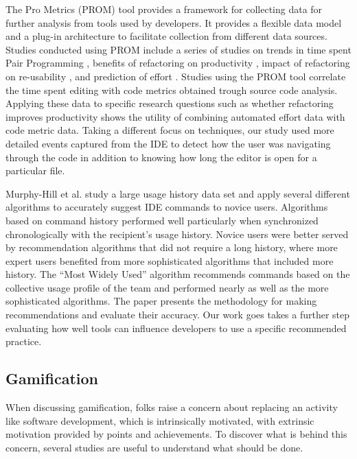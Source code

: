 \documentclass{sig-alternate}
\begin{document}
The Pro Metrics (PROM) tool provides a framework for collecting data for further analysis from tools used by developers.\cite{Coman2009Casestudy}  It provides a flexible data model and a plug-in architecture to facilitate collection from different data sources.  Studies conducted using PROM include a series of studies on trends in time spent Pair Programming \cite{Coman2008Investigating}, benefits of refactoring on productivity \cite{Moser2008Case}, impact of refactoring on re-usability \cite{Moser2006Does}, and prediction of effort \cite{Abrahamsson2007Effort}.  Studies using the PROM tool correlate the time spent editing with code metrics obtained trough source code analysis.  Applying these data to specific research questions such as whether refactoring improves productivity \cite{Moser2008Case} shows the utility of combining automated effort data with code metric data.  Taking a different focus on techniques, our study used more detailed events captured from the IDE  to detect how the user was navigating through the code in addition to knowing how long the editor is open for a particular file.

Murphy-Hill et al. study a large usage history data set and apply several different algorithms to accurately suggest IDE commands to novice users.\cite{MurphyHill2012Improving} Algorithms based on command history performed well particularly when synchronized chronologically with the recipient's usage history. Novice users were better served by recommendation algorithms that did not require a long history, where more expert users benefited from more sophisticated algorithms that included more history. The ``Most Widely Used'' algorithm recommends commands based on the collective usage profile of the team and performed nearly as well as the more sophisticated algorithms. The paper presents the methodology for making recommendations and evaluate their accuracy. Our work goes takes a further step evaluating how well tools can influence developers to use a specific recommended practice.

\subsection{Gamification}

When discussing gamification, folks raise a concern about replacing an activity like software development, which is intrinsically motivated, with extrinsic motivation provided by points and achievements.  To discover what is behind this concern, several studies are useful to understand what should be done. 
\end{document}
